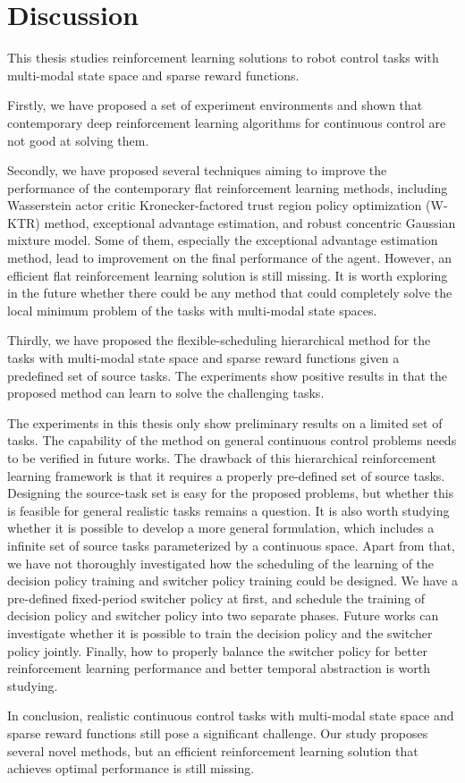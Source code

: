 \chapter{Discussion}
This thesis studies reinforcement learning solutions to robot control tasks with multi-modal state space and sparse reward functions.

Firstly, we have proposed a set of experiment environments and shown that contemporary deep reinforcement learning algorithms for continuous control are not good at solving them. 

Secondly, we have proposed several techniques aiming to improve the performance of the contemporary flat reinforcement learning methods, including Wasserstein actor critic Kronecker-factored trust region policy optimization (W-KTR) method, exceptional advantage estimation, and robust concentric Gaussian mixture model. Some of them, especially the exceptional advantage estimation method, lead to improvement on the final performance of the agent. However, an efficient flat reinforcement learning solution is still missing. It is worth exploring in the future whether there could be any method that could completely solve the local minimum problem of the tasks with multi-modal state spaces.

Thirdly, we have proposed the flexible-scheduling hierarchical method for the tasks with multi-modal state space and sparse reward functions given a predefined set of source tasks. The experiments show positive results in that the proposed method can learn to solve the challenging tasks.

The experiments in this thesis only show preliminary results on a limited set of tasks. The capability of the method on general continuous control problems needs to be verified in future works. The drawback of this hierarchical reinforcement learning framework is that it requires a properly pre-defined set of source tasks. Designing the source-task set is easy for the proposed problems, but whether this is feasible for general realistic tasks remains a question. It is also worth studying whether it is possible to develop a more general formulation, which includes a infinite set of source tasks parameterized by a continuous space. Apart from that, we have not thoroughly investigated how the scheduling of the learning of the decision policy training and switcher policy training could be designed. We have a pre-defined fixed-period switcher policy at first, and schedule the training of decision policy and switcher policy into two separate phases. Future works can investigate whether it is possible to train the decision policy and the switcher policy jointly. Finally, how to properly balance the switcher policy for better reinforcement learning performance and better temporal abstraction is worth studying.

In conclusion, realistic continuous control tasks with multi-modal state space and sparse reward functions still pose a significant challenge. Our study proposes several novel methods, but an efficient reinforcement learning solution that achieves optimal performance is still missing.